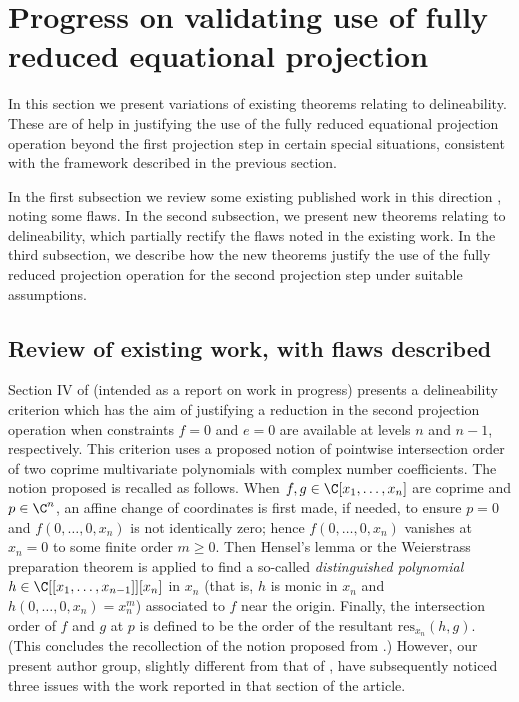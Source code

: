 \documentclass{article}
\begin{document}
\newpage

\section{Progress on validating use of fully reduced equational 
projection}

In this section
we present variations of existing theorems relating to delineability. 
These are of help in justifying the use of the fully reduced equational 
projection operation beyond the first projection step 
in certain special situations, consistent with the framework
described in the previous section.

In the first subsection we review some existing published work in this 
direction \cite{MNDS20}, noting some flaws.
In the second subsection, we present new theorems relating to
delineability, which partially rectify the flaws noted in the existing
work.
In the third subsection, we describe how the new theorems justify
the use of the fully reduced projection operation for the second
projection step under suitable assumptions.

\subsection{Review of existing work, with flaws described}
Section IV of \cite{MNDS20} (intended as a report on work in progress) 
presents a delineability criterion which has the aim of
justifying a reduction in the second projection operation
when constraints $f = 0$ and $e = 0$ are available at levels $n$ and
$n-1$, respectively. This criterion
uses a proposed notion of pointwise intersection order
of two coprime multivariate polynomials with complex number coefficients.
The notion proposed is recalled as follows.
When $f, g \in \C[x_1, \ldots, x_n]$ are coprime and $p \in \C^n$,
an affine change of coordinates is first made, if needed, to ensure
$p = 0$ and $f(0, \ldots, 0, x_n)$ is not identically zero;
hence $f(0, \ldots, 0, x_n)$ vanishes at $x_n = 0$ 
to some finite order $m \ge 0$.
Then Hensel's lemma or the Weierstrass preparation theorem is applied
to find a so-called {\em distinguished polynomial}
$h \in \C[[x_1, \ldots, x_{n-1}]][x_n]$ in $x_n$
(that is, $h$ is monic in $x_n$ and $h(0, \ldots, 0, x_n) = x_n^m$)
associated to $f$ near the origin.
Finally, the intersection order of $f$ and $g$ at $p$
is defined to be the order of the resultant $\mathrm{res}_{x_n}(h,g)$.
(This concludes the recollection of the notion proposed from
\cite{MNDS20}.)
However, our present author group, slightly different from that of 
\cite{MNDS20}, have subsequently noticed three issues with the work 
reported in that section of the article.
\end{document}
